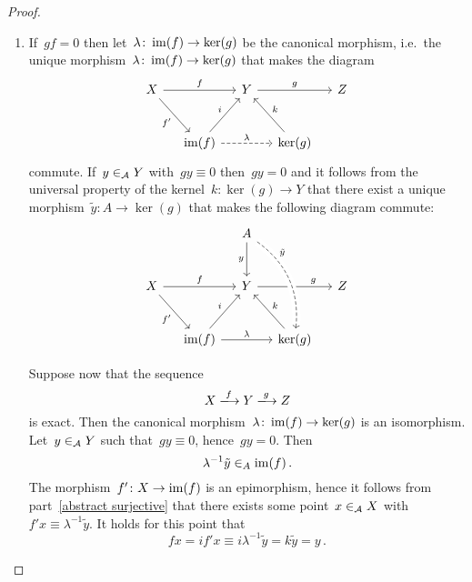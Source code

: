 \begin{proof}
  \begin{enumerate}[resume]
    \item 
      If~$gf = 0$ then let~$\lambda \colon \operatorname{im}(f) \to \ker(g)$ be the canonical morphism, i.e.\ the unique morphism~$\lambda \colon \operatorname{im}(f) \to \ker(g)$ that makes the diagram
      \[
        \begin{tikzcd}[column sep = small, row sep = large]
            X
            \arrow{rr}[above]{f}
            \arrow{dr}[below left]{f'}
          & {}
          & Y
            \arrow{rr}[above]{g}
          & {}
          & Z
          \\
            {}
          & \im(f)
            \arrow{ur}[above left]{i}
            \arrow[dashed]{rr}[above]{\lambda}
          & {}
          & \ker(g)
            \arrow{ul}[above right]{k}
          & {}
        \end{tikzcd}
      \]
      commute.
      If~$y \in_{\mathcal{A}} Y$ with~$gy \equiv 0$ then~$gy = 0$ and it follows from the universal property of the kernel~$k \colon \ker(g) \to Y$ that there exist a unique morphism~$\tilde{y} \colon A \to \ker(g)$ that makes the following diagram commute:
      \[
        \begin{tikzcd}[column sep = small, row sep = large]
            {}
          & {}
          & A
            \arrow{d}[left]{y}
          & {}
          & {}
          \\
            X
            \arrow{rr}[above]{f}
            \arrow{dr}[below left]{f'}
          & {}
          & Y
            \arrow{rr}[above, near end]{g}
          & {}
          & Z
          \\
            {}
          & \im(f)
            \arrow{ur}[above left]{i}
            \arrow{rr}[above]{\lambda}
          & {}
          & \ker(g)
            \arrow[from = uul, dashed, bend left, crossing over, near start, "\tilde{y}"]
            \arrow{ul}[above right]{k}
          & {}
        \end{tikzcd}
      \]
      
      Suppose now that the sequence
      \[
        X
        \xlongto{f}
        Y
        \xlongto{g}
        Z
      \]
      is exact.
      Then the canonical morphism~$\lambda \colon \operatorname{im}(f) \to \ker(g)$ is an isomorphism.
      Let~$y \in_{\mathcal{A}} Y$ such that~$gy \equiv 0$, hence~$gy = 0$.
      Then
      \[
        \lambda^{-1} \tilde{y} \in_A \operatorname{im}(f) \,.
      \]
      The morphism~$f' \colon X \to \operatorname{im}(f)$ is an epimorphism, hence it follows from part~\ref*{abstract surjective} that there exists some point~$x \in_{\mathcal{A}} X$ with~$f' x \equiv \lambda^{-1} \tilde{y}$.
      It holds for this point that
      \[
                f x
        =       i f' x
        \equiv  i \lambda^{-1} \tilde{y}
        =       k \tilde{y}
        =       y \,.
      \]
      

\end{enumerate}
\end{proof}
